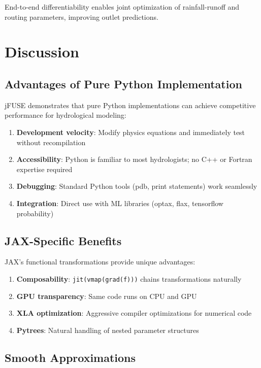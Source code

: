 \documentclass[11pt,a4paper]{article}
\begin{document}
End-to-end differentiability enables joint optimization of rainfall-runoff and routing parameters, improving outlet predictions.

\section{Discussion}

\subsection{Advantages of Pure Python Implementation}

jFUSE demonstrates that pure Python implementations can achieve competitive performance for hydrological modeling:

\begin{enumerate}
    \item \textbf{Development velocity}: Modify physics equations and immediately test without recompilation
    \item \textbf{Accessibility}: Python is familiar to most hydrologists; no C++ or Fortran expertise required
    \item \textbf{Debugging}: Standard Python tools (pdb, print statements) work seamlessly
    \item \textbf{Integration}: Direct use with ML libraries (optax, flax, tensorflow probability)
\end{enumerate}

\subsection{JAX-Specific Benefits}

JAX's functional transformations provide unique advantages:

\begin{enumerate}
    \item \textbf{Composability}: \texttt{jit(vmap(grad(f)))} chains transformations naturally
    \item \textbf{GPU transparency}: Same code runs on CPU and GPU
    \item \textbf{XLA optimization}: Aggressive compiler optimizations for numerical code
    \item \textbf{Pytrees}: Natural handling of nested parameter structures
\end{enumerate}

\subsection{Smooth Approximations}
\end{document}
